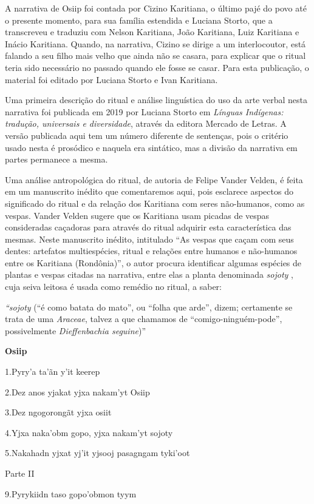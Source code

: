 A narrativa de Osiip foi contada por Cizino Karitiana, o último pajé do
povo até o presente momento, para sua família estendida e Luciana
Storto, que a transcreveu e traduziu com Nelson Karitiana, João
Karitiana, Luiz Karitiana e Inácio Karitiana. Quando, na narrativa,
Cizino se dirige a um interlocoutor, está falando a seu filho mais velho
que ainda não se casara, para explicar que o ritual teria sido
necessário no passado quando ele fosse se casar. Para esta publicação, o
material foi editado por Luciana Storto e Ivan Karitiana.

Uma primeira descrição do ritual e análise linguística do uso da arte
verbal nesta narrativa foi publicada em 2019 por Luciana Storto em
\emph{Línguas Indígenas: tradução, universais e diversidade}, através da
editora Mercado de Letras. A versão publicada aqui tem um número
diferente de sentenças, pois o critério usado nesta é prosódico e
naquela era sintático, mas a divisão da narrativa em partes permanece a
mesma.

Uma análise antropológica do ritual, de autoria de Felipe Vander Velden,
é feita em um manuscrito inédito que comentaremos aqui, pois esclarece
aspectos do significado do ritual e da relação dos Karitiana com seres
não-humanos, como as vespas. Vander Velden sugere que os Karitiana usam
picadas de vespas consideradas caçadoras para através do ritual adquirir
esta característica das mesmas. Neste manuscrito inédito, intitulado
``As vespas que caçam com seus dentes: artefatos multiespécies, ritual e
relações entre humanos e não-humanos entre os Karitiana (Rondônia)'', o
autor procura identificar algumas espécies de plantas e vespas citadas
na narrativa, entre elas a planta denominada \emph{sojoty} , cuja seiva
leitosa é usada como remédio no ritual, a saber:

\emph{``sojoty} (``é como batata do mato'', ou ``folha que arde'',
dizem; certamente se trata de uma \emph{Araceae}, talvez a que chamamos
de ``comigo-ninguém-pode'', possivelmente \emph{Dieffenbachia
seguine})''

\textbf{Osiip}

1.Pyry'a ta'ãn y'it keerep

2.Dez anos yjakat yjxa nakam'yt Osiip

3.Dez ngogorongãt yjxa osiit

4.Yjxa naka'obm gopo, yjxa nakam'yt sojoty

5.Nakahadn yjxat yj'it yjsooj pasagngam tyki'oot

Parte II

9.Pyrykiidn taso gopo'obmon tyym

